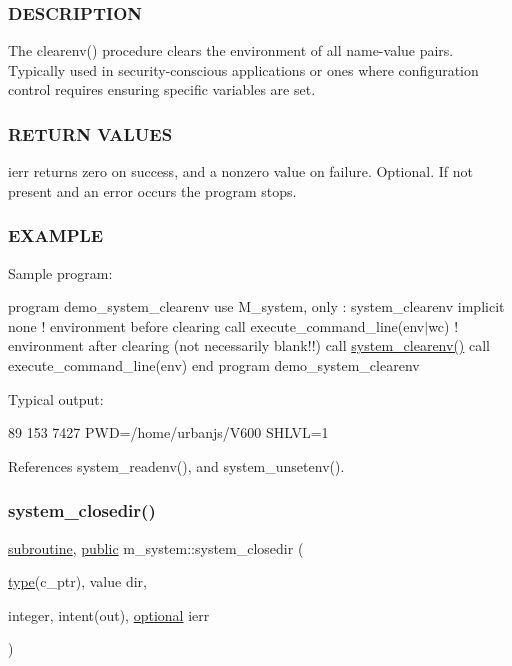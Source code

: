 \subsubsection*{D\+E\+S\+C\+R\+I\+P\+T\+I\+ON}

The clearenv() procedure clears the environment of all name-\/value pairs. Typically used in security-\/conscious applications or ones where configuration control requires ensuring specific variables are set.

\subsubsection*{R\+E\+T\+U\+RN V\+A\+L\+U\+ES}

ierr returns zero on success, and a nonzero value on failure. Optional. If not present and an error occurs the program stops.

\subsubsection*{E\+X\+A\+M\+P\+LE}

Sample program\+:

program demo\+\_\+system\+\_\+clearenv use M\+\_\+system, only \+: system\+\_\+clearenv implicit none ! environment before clearing call execute\+\_\+command\+\_\+line(\textquotesingle{}env$\vert$wc\textquotesingle{}) ! environment after clearing (not necessarily blank!!) call \hyperlink{namespacem__system_a9c34787b170ab8d41000d7c3acb60736}{system\+\_\+clearenv()} call execute\+\_\+command\+\_\+line(\textquotesingle{}env\textquotesingle{}) end program demo\+\_\+system\+\_\+clearenv

Typical output\+:

89 153 7427 P\+WD=/home/urbanjs/\+V600 S\+H\+L\+VL=1 

References system\+\_\+readenv(), and system\+\_\+unsetenv().

\mbox{\label{namespacem__system_acd442b52c64fc50482bc08b0ac8a50d1}} 
\subsubsection{\texorpdfstring{system\+\_\+closedir()}{system\_closedir()}}
{\footnotesize\ttfamily \hyperlink{M__stopwatch_83_8txt_acfbcff50169d691ff02d4a123ed70482}{subroutine}, \hyperlink{M__stopwatch_83_8txt_a2f74811300c361e53b430611a7d1769f}{public} m\+\_\+system\+::system\+\_\+closedir (\begin{DoxyParamCaption}\item[{\hyperlink{stop__watch_83_8txt_a70f0ead91c32e25323c03265aa302c1c}{type}(c\+\_\+ptr), value}]{dir,  }\item[{integer, intent(out), \hyperlink{option__stopwatch_83_8txt_aa4ece75e7acf58a4843f70fe18c3ade5}{optional}}]{ierr }\end{DoxyParamCaption})}




